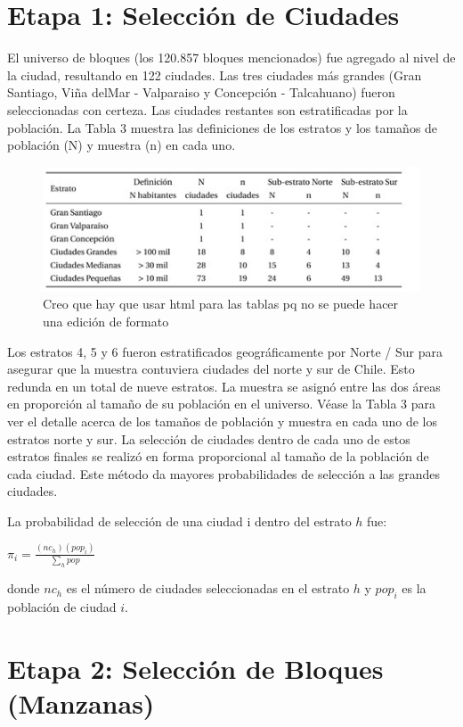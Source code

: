 \documentclass[
]{book}
\begin{document}
\hypertarget{etapa-1-selecciuxf3n-de-ciudades}{%
\section{Etapa 1: Selección de
Ciudades}\label{etapa-1-selecciuxf3n-de-ciudades}}

El universo de bloques (los 120.857 bloques mencionados) fue agregado al
nivel de la ciudad, resultando en 122 ciudades. Las tres ciudades más
grandes (Gran Santiago, Viña delMar - Valparaiso y Concepción -
Talcahuano) fueron seleccionadas con certeza. Las ciudades restantes son
estratificadas por la población. La Tabla 3 muestra las definiciones de
los estratos y los tamaños de población (N) y muestra (n) en cada uno.

\begin{figure}
\centering
\includegraphics{graficos/selec_ciudades.jpg}
\caption{Creo que hay que usar html para las tablas pq no se puede hacer
una edición de formato}
\end{figure}

Los estratos 4, 5 y 6 fueron estratificados geográficamente por Norte /
Sur para asegurar que la muestra contuviera ciudades del norte y sur de
Chile. Esto redunda en un total de nueve estratos. La muestra se asignó
entre las dos áreas en proporción al tamaño de su población en el
universo. Véase la Tabla 3 para ver el detalle acerca de los tamaños de
población y muestra en cada uno de los estratos norte y sur. La
selección de ciudades dentro de cada uno de estos estratos finales se
realizó en forma proporcional al tamaño de la población de cada ciudad.
Este método da mayores probabilidades de selección a las grandes
ciudades.

La probabilidad de selección de una ciudad i dentro del estrato \(h\)
fue:

\(\pi_i=\frac{(nc_h)(pop_i)}{\sum_h pop}\)

donde \(nc_h\) es el número de ciudades seleccionadas en el estrato
\(h\) y \(pop_i\) es la población de ciudad \(i\).

\hypertarget{etapa-2-selecciuxf3n-de-bloques-manzanas}{%
\section{Etapa 2: Selección de Bloques
(Manzanas)}\label{etapa-2-selecciuxf3n-de-bloques-manzanas}}
\end{document}
